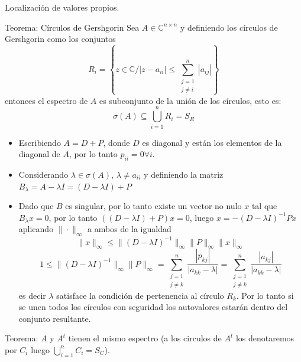 \documentclass[11pt]{beamer}
\begin{document}
    \begin{frame}{Localizaci\'on de valores propios.}
    \begin{block}{Teorema: C\'irculos de Gershgorin}
       Sea $A \in \mathbb{C}^{n \times n}$ y definiendo los c\'irculos de Gershgorin
    como los conjuntos
    $$
    R_i = \left\{z \in \mathbb{C} / |z-a_{ii}| \leq \sum_{\substack{j=1 \\ j\neq i}}^n 
    |a_{ij}|\right\}
    $$
    entonces el espectro de $A$ es subconjunto de la uni\'on de los c\'irculos, esto es:
    $$
    \sigma(A) \subseteq \bigcup_{i=1}^nR_i = S_R 
    $$
    \end{block}
    \end{frame}
    \begin{frame}
    \begin{itemize}
       \item<1-> Escribiendo $A=D+P$, donde $D$ es diagonal y est\'an los elementos de la
    diagonal de $A$, por lo tanto $p_{ii} = 0 \forall i$.
    \item<2-> Considerando $\lambda \in \sigma(A)$, $\lambda \neq a_{ii}$ y definiendo la
    matriz $B_{\lambda} = A - \lambda I = (D - \lambda I) + P$
    \item<3-> Dado que $B$ es singular, por lo tanto existe un vector no nulo $x$ tal que $B_{\lambda}x 
    = 0$, por lo tanto $(( D - \lambda I ) + P ) x = 0$, luego $x = -( D - \lambda I )^{-1}Px$ 
    aplicando $\|\cdot\|_{\infty}$ a ambos de la igualdad
    $$
    \|x\|_{\infty} \leq \|(D-\lambda I)^{-1}\|_{\infty}\|P\|_{\infty}\|x\|_{\infty}
    $$
    $$
    1 \leq \|(D-\lambda I)^{-1}\|_{\infty}\|P\|_{\infty} = \sum_{\substack{j=1 \\ j \neq 
    k}}^n\dfrac{|p_{kj}|}{|a_{kk}-\lambda|} = \sum_{\substack{j=1 \\ j \neq 
    k}}^n\dfrac{|a_{kj}|}{|a_{kk}-\lambda|}
    $$
    es decir $\lambda$ satisface la condici\'on de pertenencia al c\'irculo $R_k$. Por lo tanto si se 
    unen todos los c\'irculos con seguridad los autovalores estar\'an dentro del conjunto resultante.
    \end{itemize}
    \end{frame}
    \begin{frame}
    \begin{block}{Teorema:}
    $A$ y $A^t$ tienen el mismo espectro (a los circulos de $A^t$ los denotaremos por $C_i$ luego 
    $\bigcup_{i = 1}^n C_i = S_C$).
    \end{block}
    \end{frame}
\end{document}
